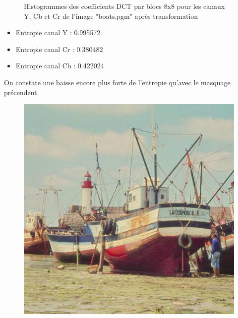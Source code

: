 \documentclass[12pt]{report}
\begin{document}
\begin{figure}[H]
\begin{center}
\caption{Histogrammes des coefficients DCT par blocs 8x8 pour les canaux Y, Cb et Cr de l'image "boats.pgm" après transformation}
\end{center}
\end{figure}

\begin{itemize}
\item Entropie canal Y : 0.995572
\item Entropie canal Cr : 0.380482
\item Entropie canal Cb : 0.422024\\
\end{itemize}

On constate une baisse encore plus forte de l'entropie qu'avec le masquage précendent.

\begin{figure}[H]
\begin{center}
\includegraphics[scale=0.4]{../ImageRes/blockidct_transform_result.jpg} 

\end{center}
\end{figure}
\end{document}
